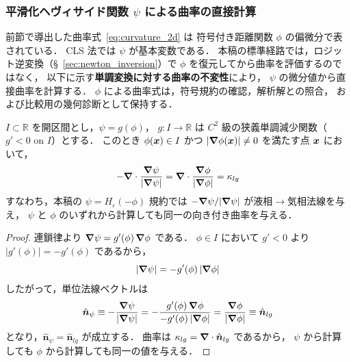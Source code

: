 \subsubsection{平滑化ヘヴィサイド関数 \texorpdfstring{$\psi$}{ψ} による曲率の直接計算}
\label{sec:curvature_direct_psi}

前節で導出した曲率式~\eqref{eq:curvature_2d} は
符号付き距離関数 $\phi$ の偏微分で表されている．
CLS 法では $\psi$ が基本変数である．
本稿の標準経路では，ロジット逆変換（§~\ref{sec:newton_inversion}）で
$\phi$ を復元してから曲率を評価するのではなく，
以下に示す\textbf{単調変換に対する曲率の不変性}により，
$\psi$ の微分値から直接曲率を計算する．
$\phi$ による曲率式は，符号規約の確認，解析解との照合，
および比較用の幾何診断として保持する．

\begin{theorem}[レベルセット曲率の単調変換不変性]
\label{thm:curvature_invariance}
$I \subset \mathbb{R}$ を開区間とし，$\psi = g(\phi)$，
$g : I \to \mathbb{R}$ は $C^2$ 級の狭義単調減少関数（$g' < 0$ on $I$）とする．
このとき $\phi(\bm{x}) \in I$ かつ $|\bm{\nabla}\phi(\bm{x})| \neq 0$ を満たす点 $\bm{x}$ において，
\begin{equation}
  -\bm{\nabla} \cdot \frac{\bm{\nabla} \psi}{|\bm{\nabla} \psi|}
  = \bm{\nabla} \cdot \frac{\bm{\nabla} \phi}{|\bm{\nabla} \phi|}
  = \kappa_{lg}
\end{equation}
すなわち，本稿の $\psi=H_\varepsilon(-\phi)$ 規約では
$-\bm{\nabla}\psi/|\bm{\nabla}\psi|$ が液相$\to$気相法線を与え，
$\psi$ と $\phi$ のいずれから計算しても同一の向き付き曲率を与える．
\end{theorem}
\begin{proof}
連鎖律より $\bm{\nabla} \psi = g'(\phi)\,\bm{\nabla} \phi$ である．
$\phi \in I$ において $g' < 0$ より $|g'(\phi)| = -g'(\phi)$ であるから，
\[
  |\bm{\nabla} \psi| = -g'(\phi)\,|\bm{\nabla} \phi|
\]
したがって，単位法線ベクトルは
\[
  \hat{\bm n}_\psi
  \equiv -\frac{\bm{\nabla} \psi}{|\bm{\nabla} \psi|}
  = -\frac{g'(\phi)\,\bm{\nabla} \phi}{-g'(\phi)\,|\bm{\nabla} \phi|}
  = \frac{\bm{\nabla} \phi}{|\bm{\nabla} \phi|}
  \equiv \hat{\bm n}_{lg}
\]
となり，$\hat{\bm n}_\psi = \hat{\bm n}_{lg}$ が成立する．
曲率は $\kappa_{lg} = \bm{\nabla} \cdot \hat{\bm n}_{lg}$ であるから，
$\psi$ から計算しても $\phi$ から計算しても同一の値を与える．
\end{proof}

